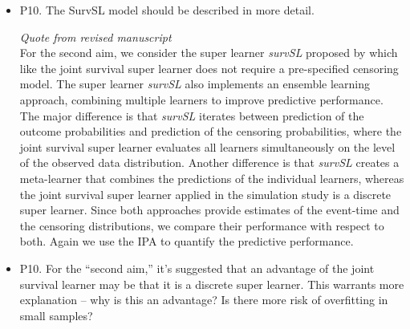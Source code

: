 \documentclass[a4paper,danish]{article}
\newcommand{\1}{\mathds{1}}
\newcommand{\qrev}[2]{
\vspace{.5em}
\begin{tcolorbox}[boxrule=0pt]
\hfill{\it\footnotesize Quote from revised manuscript#1}\\[.5em]
#2
\end{tcolorbox}
}
\newcommand{\answer}[1]{{\vspace{1em}{\bf #1}\vspace{1em}}}
\begin{document}
\begin{itemize}
\item P10. The SurvSL model should be described in more detail.

  \answer{  
  Agreed. We have expanded this section as follows:
  }

  \qrev{}{
  For the second aim, we consider the super learner {\it survSL}
proposed by \citep{westling2021inference} which like the joint
survival super learner does not require a pre-specified censoring
model. The super learner {\it survSL} also implements an ensemble
learning approach, combining multiple learners to improve
predictive performance.  The major difference is that {\it survSL}
iterates between prediction of the outcome probabilities and
prediction of the censoring probabilities, where the joint survival
super learner evaluates all learners simultaneously on the level of
the observed data distribution. Another difference is that {\it
  survSL} creates a meta-learner that combines the predictions of the
individual learners, whereas the joint survival super learner applied
in the simulation study is a discrete super learner. Since both
approaches provide estimates of the event-time and the censoring
distributions, we compare their performance with respect to
both. Again we use the IPA to quantify the predictive performance.
  }

\item P10. For the ``second aim,'' it's suggested that an advantage of the
joint survival learner may be that it is a discrete super
learner. This warrants more explanation -- why is this an advantage?
Is there more risk of overfitting in small samples?

  
  \answer{

  This is an interesting point. To our knowledge, the finite sample
  performance of a discrete versus continuous (ensemble) super learner
  is not well understood. We conjecture that the discrete super learner
  may be advantageous in the case where at least one of the learners in
  the library is consistent and the data set is large enough, whereas
  the ensemble super learner could have an advantage when all learners
  are misspecified to some extent. We have expanded on this and tried to
  clarify that this only a possible explanation and not a strict fact.
  }


\end{itemize}
\end{document}
